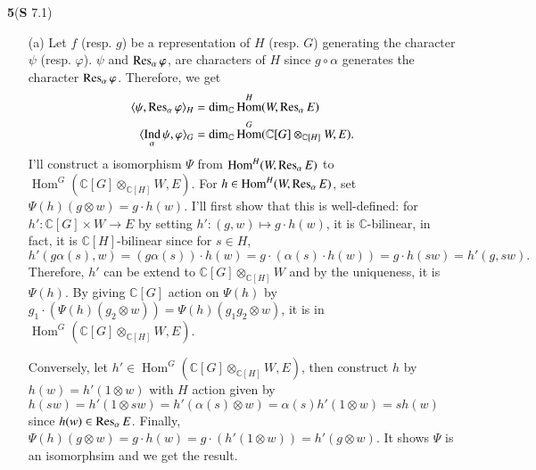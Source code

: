 \documentclass[a4paper, 12pt]{article}
\theoremstyle{Mydefinition}
\theoremstyle{Mytheorem}
\DeclareMathOperator{\Ind}{Ind}
\DeclareMathOperator{\Hom}{Hom}
\begin{document}
\noindent \textbf{5}(\textbf{S} 7.1)
\begin{enumerate}
    \item[(a)]Let $f$ (resp. $g$) be a representation of $H$ (resp. $G$) generating the character $\psi$ (resp. $\varphi$). $\psi$ and $\Res_\alpha \varphi$, are characters of $H$ since $g\circ \alpha$ generates the character $\Res_\alpha \varphi$. Therefore, we get
\begin{equation}
    \begin{split}
        \langle \psi, \Res_\alpha \varphi\rangle_H &= \dim_\mathbb{C} \Hom^H(W,\Res_\alpha E)\\
        \langle \Ind_\alpha\psi,  \varphi\rangle_G &= \dim_\mathbb{C} \Hom^G(\mathbb{C}[G]\otimes_{\mathbb{C}[H]}W, E).
    \end{split}
\end{equation}
I'll construct a isomorphism $\Psi$ from $\Hom^H(W,\Res_\alpha E)$ to $\Hom^G(\mathbb{C}[G]\otimes_{\mathbb{C}[H]}W, E)$. For $h\in \Hom^H(W,\Res_\alpha E)$, set $\Psi(h)(g\otimes w) = g\cdot h(w)$. I'll first show that this is well-defined: for $h':\mathbb{C}[G]\times W\rightarrow E$ by setting $h':(g, w)\mapsto g\cdot h(w)$, it is $\mathbb{C}$-bilinear, in fact, it is $\mathbb{C}[H]$-bilinear since for $s\in H$,
\begin{equation}
    h'(g\alpha(s), w) = (g\alpha(s))\cdot h(w) = g\cdot(\alpha(s)\cdot h(w)) = g\cdot h(sw) = h'(g, sw).
\end{equation}
Therefore, $h'$ can be extend to $\mathbb{C}[G]\otimes_{\mathbb{C}[H]}W$ and by the uniqueness, it is $\Psi(h)$. By giving $\mathbb{C}[G]$ action on $\Psi(h)$ by $g_1\cdot \left(\Psi(h)(g_2\otimes w)\right) = \Psi(h)(g_1g_2\otimes w)$, it is in $\Hom^G(\mathbb{C}[G]\otimes_{\mathbb{C}[H]}W, E)$.

Conversely, let $h'\in \Hom^G(\mathbb{C}[G]\otimes_{\mathbb{C}[H]}W, E)$, then construct $h$ by $h(w) = h'(1\otimes w)$ with $H$ action given by $h(sw) = h'(1\otimes sw) = h'(\alpha(s)\otimes w) = \alpha(s)h'(1\otimes w) = sh(w)$ since $h(w)\in \Res_\alpha E$. Finally, $\Psi(h)(g\otimes w) = g\cdot h(w) = g\cdot \left(h'(1\otimes w)\right) = h'(g\otimes w)$. It shows $\Psi$ is an isomorphsim and we get the result.


\end{enumerate}
\end{document}

